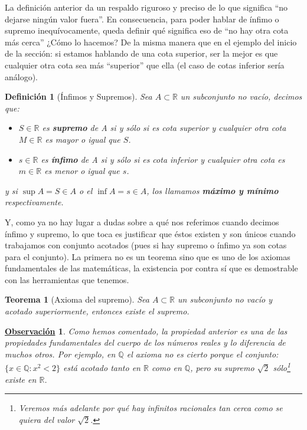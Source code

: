 \documentclass[10pt,a4paper,openright]{book}
\theoremstyle{break}
\newtheorem{defi}{Definición}[chapter]
\newtheorem{theo}{Teorema}[chapter]
\newtheorem{obs}{\underline{Observación}}[chapter]
\begin{document}
La definición anterior da un respaldo riguroso y preciso de lo que significa ``no dejarse ningún valor fuera''. En consecuencia, para poder hablar de ínfimo o supremo inequívocamente, queda definir qué significa eso de ``no hay otra cota más cerca'' ¿Cómo lo hacemos? De la misma manera que en el ejemplo del inicio de la sección: si estamos hablando de una cota superior, ser la mejor es que cualquier otra cota sea más ``superior'' que ella (el caso de cotas inferior sería análogo).

\begin{defi}[Ínfimos y Supremos]
Sea $A\subset \mathbb{R}$ un subconjunto no vacío, decimos que:
\begin{itemize}
\item $S\in \mathbb R$ es \textbf{supremo} de A si y sólo si es cota superior y cualquier otra cota $M\in \mathbb R$ es mayor o igual que $S$.

\item $s\in \mathbb R$ es \textbf{ínfimo} de A si y sólo si es cota inferior y cualquier otra cota es $m\in \mathbb R$ es menor o igual que $s$.
\end{itemize}
y si $\sup A = S\in A$ o el $\inf A = s \in A$, los llamamos \textbf{máximo y mínimo} respectivamente.
\end{defi}

Y, como ya no hay lugar a dudas sobre a qué nos referimos cuando decimos ínfimo y supremo, lo que toca es justificar que éstos existen y son únicos cuando trabajamos con conjunto acotados (pues si hay supremo o ínfimo ya son cotas para el conjunto). La primera no es un teorema sino que es uno de los axiomas fundamentales de las matemáticas, la existencia por contra sí que es demostrable con las herramientas que tenemos.

\begin{theo}[Axioma del supremo]
Sea $A\subset \mathbb R$ un subconjunto no vacío y acotado superiormente, entonces existe el supremo.
\end{theo}

\begin{obs}
Como hemos comentado, la propiedad anterior es una de las propiedades fundamentales del cuerpo de los números reales y lo diferencia de muchos otros. Por ejemplo, en $\mathbb Q$ el axioma no es cierto porque el conjunto: $\{x\in \mathbb Q: x^2 < 2\}$ está acotado tanto en $\mathbb{R}$ como en $\mathbb{Q}$, pero su supremo $\sqrt{2}$ sólo\footnote{\label{note: densidad de Q en R}  Veremos más adelante por qué hay infinitos racionales tan cerca como se quiera del valor $\sqrt{2}$.} existe en $\mathbb R$.
\end{obs}
\end{document}
